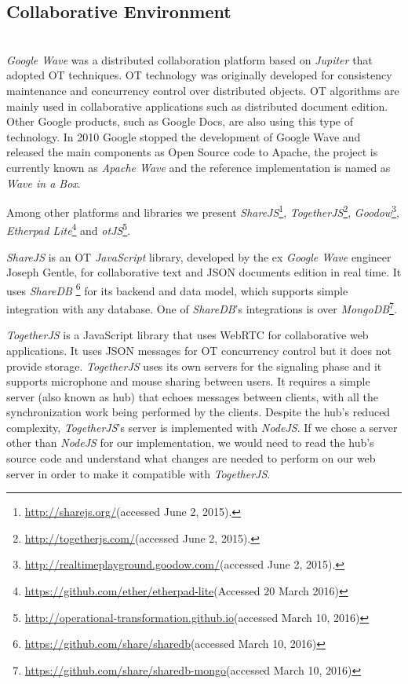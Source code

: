   \subsection{Collaborative Environment}\label{collabenv}~\\
	\emph{Google Wave} was a distributed collaboration platform based on \emph{Jupiter}\cite{jupiter} that adopted \ac{OT} techniques.
        \ac{OT} technology was originally developed for consistency maintenance and concurrency control over distributed objects.
        \ac{OT} algorithms are mainly used in collaborative applications such as distributed document edition.
    Other Google products, such as Google Docs, are also using this type of technology. In 2010 Google stopped the development of Google Wave and released the main components as Open Source code to Apache, the project is currently known as \emph{Apache Wave} and the reference implementation is named as \emph{Wave in a Box}.

    Among other platforms and libraries we present \emph{ShareJS}\footnote{\url{http://sharejs.org/}(accessed June 2, 2015).}, \emph{TogetherJS}\footnote{\url{http://togetherjs.com/}(accessed June 2, 2015).}, \emph{Goodow}\footnote{\url{http://realtimeplayground.goodow.com/}(accessed June 2, 2015).}, \emph{Etherpad Lite}\footnote{\url{https://github.com/ether/etherpad-lite}(Accessed 20 March 2016)} and \emph{otJS}\footnote{\url{http://operational-transformation.github.io}(accessed March 10, 2016)}.

	\emph{ShareJS} is an \ac{OT} \emph{JavaScript} library, developed by the ex \emph{Google Wave} engineer Joseph Gentle, for collaborative text and \ac{JSON} documents edition in real time. It uses \emph{ShareDB} \footnote{\url{https://github.com/share/sharedb}(accessed March 10, 2016)} for its backend and data model, which supports simple integration with any database. One of \emph{ShareDB}'s integrations is over \emph{MongoDB}\footnote{\url{https://github.com/share/sharedb-mongo}(accessed March 10, 2016)}.

	\emph{TogetherJS} is a JavaScript library that uses \ac{WebRTC} for collaborative web applications. It uses \ac{JSON} messages for \ac{OT} concurrency control but it does not provide storage. \emph{TogetherJS} uses its own servers for the signaling phase and it supports microphone and mouse sharing between users. It requires a simple server (also known as hub) that echoes messages between clients, with all the synchronization work being performed by the clients. Despite the hub's reduced complexity, \emph{TogetherJS}'s server is implemented with \emph{NodeJS}. If we chose a server other than \emph{NodeJS} for our implementation, we would need to read the hub's source code and understand what changes are needed to perform on our web server in order to make it compatible with \emph{TogetherJS}.

